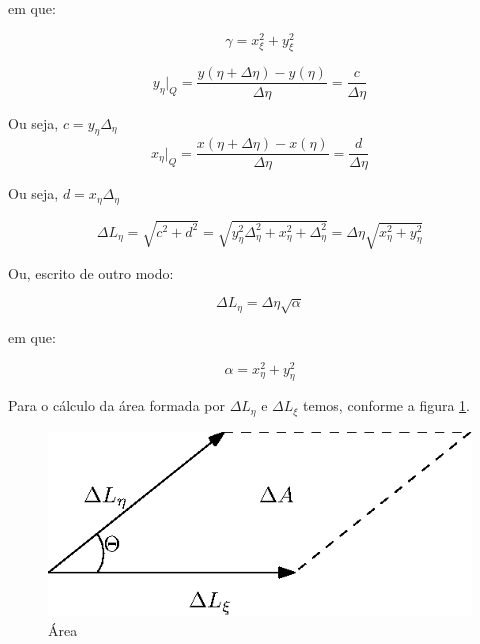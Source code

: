 em que:

\begin{equation}
    \label{eq:2.12}
    \gamma = x_\xi^2 + y_\xi^2
\end{equation}

\begin{equation*}
    y_\eta \vert_Q = \frac{y(\eta+\Delta \eta)-y(\eta)}{\Delta \eta} = \frac{c}{\Delta \eta}
\end{equation*}

Ou seja, $c=y_\eta \Delta_\eta$
\begin{equation*}
    x_\eta \vert_Q = \frac{x(\eta+\Delta \eta)-x(\eta)}{\Delta \eta} = \frac{d}{\Delta \eta}
\end{equation*}

Ou seja, $d=x_\eta \Delta_\eta$

\begin{equation*}
    \Delta L_\eta = \sqrt{c^2+d^2} = \sqrt{y_\eta^2 \Delta_\eta^2 + x_\eta^2+\Delta_\eta^2} = \Delta \eta \sqrt{x_\eta^2 + y_\eta^2}
\end{equation*}

Ou, escrito de outro modo:

\begin{equation}
    \label{eq:2.13}
    \Delta L_\eta = \Delta \eta \sqrt{\alpha}
\end{equation}

em que:

\begin{equation}
    \label{eq:2.14}
    \alpha = x_\eta^2 + y_\eta^2
\end{equation}

Para o cálculo da área formada por $\Delta L_\eta$ e $\Delta L_\xi$ temos, conforme a figura \ref{fig:area}.

\begin{figure}[]
    \centering
    \includegraphics{fig/area.eps}
    \caption{Área}
    \label{fig:area}
\end{figure}

